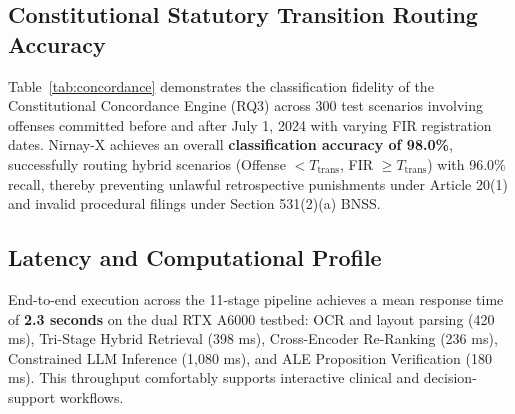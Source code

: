 \documentclass[conference]{IEEEtran}
\begin{document}
\subsection{Constitutional Statutory Transition Routing Accuracy}
Table~\ref{tab:concordance} demonstrates the classification fidelity of the Constitutional Concordance Engine (RQ3) across 300 test scenarios involving offenses committed before and after July 1, 2024 with varying FIR registration dates. Nirnay-X achieves an overall \textbf{classification accuracy of 98.0\%}, successfully routing hybrid scenarios (Offense $< T_{\text{trans}}$, FIR $\ge T_{\text{trans}}$) with 96.0\% recall, thereby preventing unlawful retrospective punishments under Article 20(1) and invalid procedural filings under Section 531(2)(a) BNSS.

\begin{table}[!t]
\caption{Statutory Transition Routing Confusion Matrix ($N=300$)}
\label{tab:concordance}
\centering
{}
\end{table}

\subsection{Latency and Computational Profile}
End-to-end execution across the 11-stage pipeline achieves a mean response time of \textbf{2.3 seconds} on the dual RTX A6000 testbed: OCR and layout parsing (420 ms), Tri-Stage Hybrid Retrieval (398 ms), Cross-Encoder Re-Ranking (236 ms), Constrained LLM Inference (1,080 ms), and ALE Proposition Verification (180 ms). This throughput comfortably supports interactive clinical and decision-support workflows.
\end{document}
